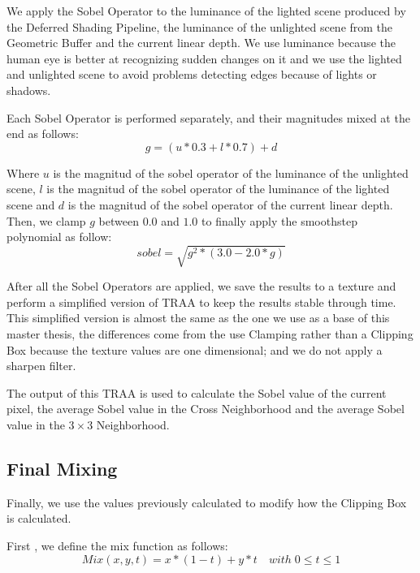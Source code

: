 \documentclass{cslthse-msc}
\begin{document}
We apply the Sobel Operator to the luminance of the lighted scene produced by the Deferred Shading Pipeline, the luminance of the unlighted scene from the Geometric Buffer and the current linear depth. We use luminance because the human eye is better at recognizing sudden changes on it and we use the lighted and unlighted scene to avoid problems detecting edges because of lights or shadows.

Each Sobel Operator is performed separately, and their magnitudes mixed at the end as follows:
\begin{equation} \label{eq:sobel_g}
	g=(u*0.3 +l*0.7)+d 
\end{equation}

Where $u$ is the magnitud of the sobel operator of the luminance of the unlighted scene, $l$ is the magnitud of the sobel operator of the luminance of the lighted scene and $d$ is the magnitud of the sobel operator of the current linear depth. \\

Then, we clamp $g$ between $0.0$ and $1.0$ to finally apply the smoothstep polynomial as follow:
\begin{equation} \label{eq:sobel_sqrt}
sobel=\sqrt{g^2*(3.0-2.0*g)} 
\end{equation}

After all the Sobel Operators are applied, we save the results to a texture and perform a simplified version of TRAA to keep the results stable through time. This simplified version is almost the same as the one we use as a base of this master thesis, the differences come from the use Clamping rather than a Clipping Box because the texture values are one dimensional; and we do not apply a sharpen filter.

The output of this TRAA is used to calculate the Sobel value of the current pixel, the average Sobel value in the Cross Neighborhood and the average Sobel value in the $3\times 3$ Neighborhood.

\subsection{Final Mixing}
Finally, we use the values previously calculated to modify how the Clipping Box is calculated.

First , we define the mix function as follows:
\begin{equation} \label{eq:mixfunction}
Mix(x,y,t)=x*(1-t)+y*t\quad with\; 0\leq t\leq 1
\end{equation} 
\end{document}
